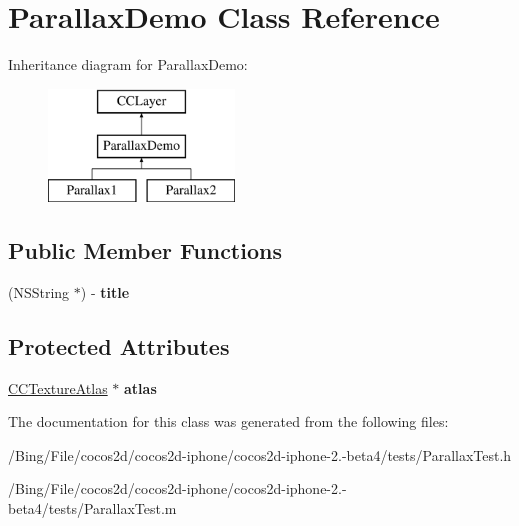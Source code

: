 \hypertarget{interface_parallax_demo}{\section{Parallax\-Demo Class Reference}
\label{interface_parallax_demo}
}
Inheritance diagram for Parallax\-Demo\-:\begin{figure}[H]
\begin{center}
\leavevmode
\includegraphics[height=3.000000cm]{interface_parallax_demo}
\end{center}
\end{figure}
\subsection*{Public Member Functions}
\begin{DoxyCompactItemize}
\item 
\hypertarget{interface_parallax_demo_a21b30a51889912e7e32010d7b2aa1a6d}{(N\-S\-String $\ast$) -\/ {\bfseries title}}\label{interface_parallax_demo_a21b30a51889912e7e32010d7b2aa1a6d}

\end{DoxyCompactItemize}
\subsection*{Protected Attributes}
\begin{DoxyCompactItemize}
\item 
\hypertarget{interface_parallax_demo_a55bec99d6efea0575b82fbbde1a2a23f}{\hyperlink{interface_c_c_texture_atlas}{C\-C\-Texture\-Atlas} $\ast$ {\bfseries atlas}}\label{interface_parallax_demo_a55bec99d6efea0575b82fbbde1a2a23f}

\end{DoxyCompactItemize}


The documentation for this class was generated from the following files\-:\begin{DoxyCompactItemize}
\item 
/\-Bing/\-File/cocos2d/cocos2d-\/iphone/cocos2d-\/iphone-\/2.-\/beta4/tests/Parallax\-Test.\-h\item 
/\-Bing/\-File/cocos2d/cocos2d-\/iphone/cocos2d-\/iphone-\/2.-\/beta4/tests/Parallax\-Test.\-m\end{DoxyCompactItemize}
